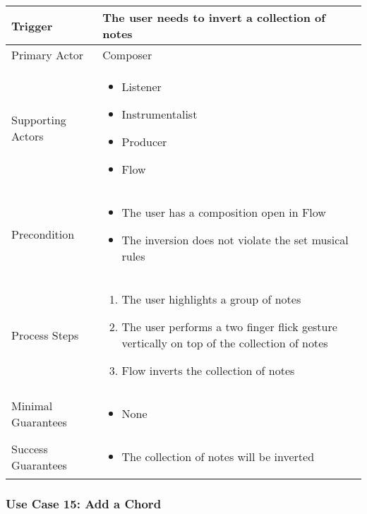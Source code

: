 \begin{tabularx}{\textwidth}{|X|X|}
\hline
Trigger & 
The user needs to invert a collection of notes \\
\hline
Primary Actor & 
Composer \\
\hline
Supporting Actors & 
\begin{itemize}
\item Listener
\item Instrumentalist
\item Producer
\item Flow
\end{itemize} \\
\hline
Precondition & 
\begin{itemize}
\item The user has a composition open in Flow
\item The inversion does not violate the set musical rules
\end{itemize} \\
\hline
Process Steps & 
\begin{enumerate}
\item The user highlights a group of notes
\item The user performs a two finger flick gesture vertically on top of the collection of notes
\item Flow inverts the collection of notes
\end{enumerate} \\
\hline
Minimal Guarantees & 
\begin{itemize}
  \item None
\end{itemize} \\
\hline
Success Guarantees & 
\begin{itemize}
  \item The collection of notes will be inverted
\end{itemize} \\
\hline
\end{tabularx}

\subsubsection{Use Case 15: Add a Chord}

